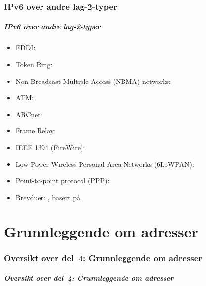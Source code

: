 \section{IPv6 over andre lag-2-typer}
\begin{frame}%
  \frametitle{IPv6 over andre lag-2-typer}
  \pause
  \begin{itemize}%
  \item FDDI: 
  \item Token Ring: 
  \item Non-Broadcast Multiple Access (NBMA) networks: 
  \item ATM: 
  \item ARCnet: 
  \item Frame Relay: 
  \item IEEE 1394 (FireWire): 
  \item Low-Power Wireless Personal Area Networks (6LoWPAN): 
  \item Point-to-point protocol (PPP): 
  \item Brevduer: , basert på 
  \end{itemize}
\end{frame}

\part{Grunnleggende om adresser}

\begin{frame}
  \partpage
\end{frame}

\section*{Oversikt over del~4: Grunnleggende om adresser}
\begin{frame}[allowframebreaks]
  \frametitle{Oversikt over del~4: Grunnleggende om adresser}
    \tableofcontents%
\end{frame}

